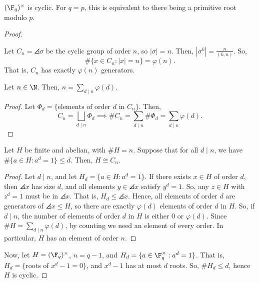 \begin{thm}
    $(\F_q)^\times$ is cyclic. For $q = p$, this is equivalent to there being a primitive root modulo $p$.
\end{thm}

\begin{proof}
    \begin{notebox*}[Fact]
        Let $C_n = \angles{\sigma}$ be the cyclic group of order $n$, so $|\sigma| = n$. Then, $|\sigma^k| = \frac{n}{(k,n)}$. So,
        $$\#\{x \in C_n : |x| = n\} = \varphi(n).$$
        That is, $C_n$ has exactly $\varphi(n)$ generators.
    \end{notebox*}

    \begin{lem}
        Let $n \in \N$. Then, $n = \sum_{d \mid n} \varphi(d)$.
    \end{lem}

    \begin{proof}
        Let $\Phi_d = \{\text{elements of order } d \text{ in } C_n\}$. Then,
        $$C_n = \bigsqcup_{d \mid n} \Phi_d \implies \# C_n = \sum_{d \mid n} \# \Phi_d = \sum_{d \mid n} \varphi(d).$$
    \end{proof}

    \begin{lem}
        Let $H$ be finite and abelian, with $\# H = n$. Suppose that for all $d \mid n$, we have $\#\{a \in H : a^d = 1\} \leq d$. Then, $H \cong C_n$.
    \end{lem}

    \begin{proof}
        Let $d \mid n$, and let $H_d = \{a \in H : a^d = 1\}$. If there exists $x \in H$ of order $d$, then $\angles{x}$ has size $d$, and all elements $y \in \angles{x}$ satisfy $y^d = 1$. So, any $z \in H$ with $z^d = 1$ must be in $\angles{x}$. That is, $H_d \leq \angles{x}$. Hence, all elements of order $d$ are generators of $\angles{x} \leq H$, so there are exactly $\varphi(d)$ elements of order $d$ in $H$. So, if $d \mid n$, the number of elements of order $d$ in $H$ is either $0$ or $\varphi(d)$. Since $\# H = \sum_{d \mid n} \varphi(d)$, by counting we need an element of every order. In particular, $H$ has an element of order $n$.
    \end{proof}

    Now, let $H = (\F_q)^\times$, $n = q - 1$, and $H_d = \{a \in \F_q^\times : a^d = 1\}$. That is, $H_d = \{\text{roots of } x^d - 1 = 0\}$, and $x^d - 1$ has at most $d$ roots. So, $\# H_d \leq d$, hence $H$ is cyclic.
\end{proof}

